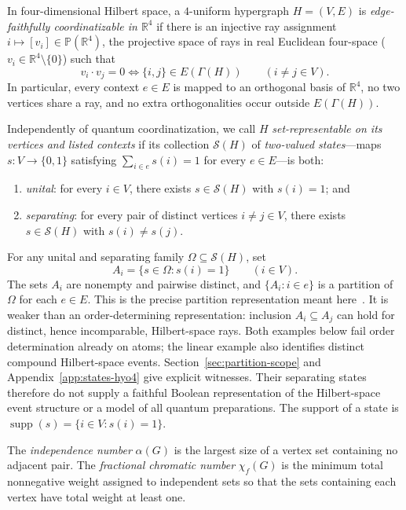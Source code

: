 \documentclass[
  aps,
  pra,
  reprint,
  superscriptaddress,
  amsmath,
  amssymb,
  nofootinbib,
  floatfix
]{revtex4-2}
\theoremstyle{definition}
\theoremstyle{remark}
\newcommand{\R}{\mathbb{R}}
\newcommand{\PP}{\mathbb{P}}
\DeclareMathOperator{\supp}{supp}
\begin{document}
In four-dimensional Hilbert space, a $4$-uniform hypergraph $H=(V,E)$ is \emph{edge-faithfully coordinatizable in $\R^4$} if there is an injective ray assignment $i\mapsto [v_i]\in\PP(\R^4)$, the projective space of rays in real Euclidean four-space ($v_i\in\R^4\setminus\{0\}$) such that
\begin{equation}\label{eq:edge-faithful}
v_i\cdot v_j = 0 \iff \{i,j\}\in E(\Gamma(H))
\qquad(i\ne j\in V).
\end{equation}
In particular, every context $e\in E$ is mapped to an orthogonal basis of $\R^4$, no two vertices share a ray, and no extra orthogonalities occur outside $E(\Gamma(H))$.

Independently of quantum coordinatization, we call $H$ \emph{set-representable on its vertices and listed contexts} if its collection $\mathcal{S}(H)$ of \emph{two-valued states}---maps $s:V\to\{0,1\}$ satisfying $\sum_{i\in e}s(i)=1$ for every $e\in E$---is both:
\begin{enumerate}
\item \emph{unital}: for every $i\in V$, there exists $s\in\mathcal{S}(H)$ with $s(i)=1$; and
\item \emph{separating}: for every pair of distinct vertices $i\ne j\in V$, there exists $s\in\mathcal{S}(H)$ with $s(i)\ne s(j)$.
\end{enumerate}
For any unital and separating family $\Omega\subseteq\mathcal{S}(H)$, set
\begin{equation}\label{eq:set-representation}
A_i=\{s\in\Omega:s(i)=1\}\qquad(i\in V).
\end{equation}
The sets $A_i$ are nonempty and pairwise distinct, and $\{A_i:i\in e\}$ is a partition of $\Omega$ for each $e\in E$. This is the precise partition representation meant here~\cite{svozil-tkadlec,svozil-2021-chroma}. It is weaker than an order-determining representation: inclusion $A_i\subseteq A_j$ can hold for distinct, hence incomparable, Hilbert-space rays. Both examples below fail order determination already on atoms; the linear example also identifies distinct compound Hilbert-space events. Section~\ref{sec:partition-scope} and Appendix~\ref{app:states-hyo4} give explicit witnesses. Their separating states therefore do not supply a faithful Boolean representation of the Hilbert-space event structure or a model of all quantum preparations. The support of a state is $\supp(s)=\{i\in V:s(i)=1\}$.

The \emph{independence number} $\alpha(G)$ is the largest size of a vertex set containing no adjacent pair. The \emph{fractional chromatic number} $\chi_f(G)$ is the minimum total nonnegative weight assigned to independent sets so that the sets containing each vertex have total weight at least one.
\end{document}
